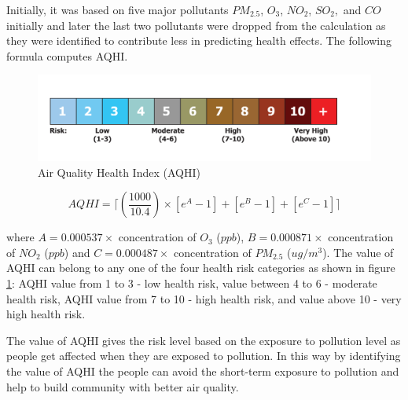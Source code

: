 Initially, it was based on five major pollutants $PM_{2.5}$, $O_3$, $NO_2$, $SO_2,$ and $CO$ initially and later the last two pollutants were dropped from the calculation as they were identified to contribute less in predicting health effects. The following formula computes AQHI.


\begin{figure}[h]
  \begin{center}
  \includegraphics[scale=0.58]{./images/figure12.png}
  \end{center}
 
  \caption{Air Quality Health Index (AQHI)}
  
  \label{aqhi}
\end{figure}


\begin{equation}
AQHI = \lceil (\frac{1000}{10.4}) \times [e^A-1]+[e^B-1]+[e^C-1] \rceil
\end{equation}

where $ A = 0.000537 \times$ concentration of  $O_3$ ($ppb$), $B = 0.000871 \times$ concentration  of $NO_2$ ($ppb$) and  $C = 0.000487 \times$ concentration of $PM_{2.5}$ ($ug/m^3$).
The value of AQHI can belong to any one of the four health risk categories as shown in figure \ref{aqhi}:
AQHI value from 1 to 3 - low health risk, value between 4 to 6 - moderate health risk, AQHI value from 7 to 10 - high health risk, and value above 10 - very high health risk.


The value of AQHI gives the risk level based on the exposure to pollution level as people get affected when they are exposed to pollution. In this way by identifying the value of AQHI the people can avoid the short-term exposure to pollution and help to build community with better air quality.  




